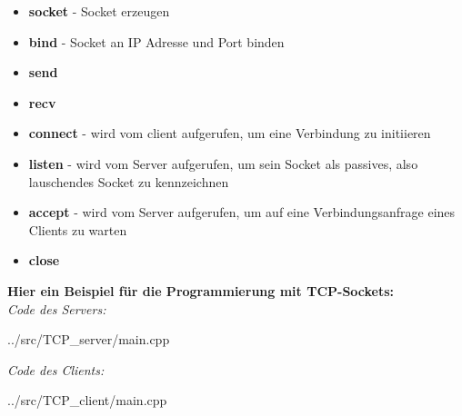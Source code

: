 \begin{itemize}
    \item \textbf{socket} - Socket erzeugen
    \item \textbf{bind} - Socket an IP Adresse und Port binden
    \item \textbf{send}
    \item \textbf{recv}
    \item \textbf{connect} - wird vom client aufgerufen, um eine Verbindung zu initiieren
    \item \textbf{listen} - wird vom Server aufgerufen, um sein Socket als passives, also lauschendes Socket zu kennzeichnen
    \item \textbf{accept} - wird vom Server aufgerufen, um auf eine Verbindungsanfrage eines Clients zu warten
    \item \textbf{close}
\end{itemize}

\newpage
\textbf{Hier ein Beispiel für die Programmierung mit TCP-Sockets:}\\

\textit{Code des Servers:}
\begin{lstinputlisting}[language=C++]
    {../src/TCP_server/main.cpp}
\end{lstinputlisting}
\newpage
\textit{Code des Clients:}
\begin{lstinputlisting}[language=C++]
    {../src/TCP_client/main.cpp}
\end{lstinputlisting}

